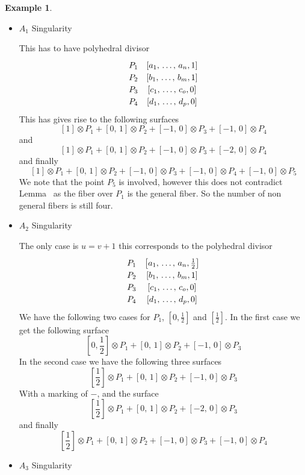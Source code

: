 \documentclass[12pt,a4paper]{book}      %
\theoremstyle{definition}
\newtheorem{ex}[thm]{Example}
\begin{document}
\begin{ex}
\begin{itemize}
\item  \begin{bf} $A_1$ Singularity \end{bf} 

This has to have polyhedral divisor 
\[\def\arraystretch{1.2}
\begin{array}{cc}
P_1 & \left[ a_1, \, \dots , \, a_n, 1 \right] \\ 
P_2 & \left[b_1 , \, \dots, \, b_m, 1 \right] \\
P_3 & \left[c_1, \, \dots, \, c_o, 0\right] \\
P_4 & \left[d_1, \, \dots, \, d_p, 0\right]  \\
\end{array}
\]
This has gives rise to the following surfaces 
\[
\left[1 \right] \otimes P_1 + \left[ 0, \,1 \right] \otimes P_2 + [-1, \, 0] \otimes P_3 + [-1, \, 0] \otimes P_4 
\]
and 
\[
\left[1 \right] \otimes P_1 + \left[ 0, \,1 \right] \otimes P_2 + [-1, \, 0] \otimes P_3 + [-2, \, 0] \otimes P_4 
\]
and finally 
\[
\left[1 \right] \otimes P_1 + \left[ 0, \,1 \right] \otimes P_2 + [-1, \, 0] \otimes P_3 + [-1, \, 0] \otimes P_4  +  [-1, \, 0] \otimes P_5
\]
We note that the point $P_5$ is involved, however this does not contradict Lemma~ as the fiber over $P_1$ is the general fiber. So the number of non general fibers is still four.
\item \begin{bf} $A_2$ Singularity \end{bf} 

The only case is $u = v+1$ this corresponds to the polyhedral divisor
\[\def\arraystretch{1.2}
\begin{array}{cc}
P_1 & \left[ a_1, \, \dots , \, a_n, \frac{1}{2} \right] \\ 
P_2 & \left[b_1 , \, \dots, \, b_m, 1 \right] \\
P_3 & \left[c_1, \, \dots, \, c_o, 0\right] \\
P_4 & \left[d_1, \, \dots, \, d_p, 0\right]  \\
\end{array}
\]
We have the following two cases for $P_1$, $[0, \frac{1}{2}]$ and $[\frac{1}{2}]$. In the first case we get the following surface
\[
\left[0, \frac{1}{2} \right] \otimes P_1 + \left[ 0, \,1 \right] \otimes P_2 + [-1, \, 0] \otimes P_3
\]
In the second case we have the following three surfaces 
\[
\left[ \frac{1}{2} \right] \otimes P_1 + \left[ 0, \,1 \right] \otimes P_2 + [-1, \, 0] \otimes P_3
\]
With a marking of $-$, and the surface
\[
\left[\frac{1}{2} \right] \otimes P_1 + \left[ 0, \,1 \right] \otimes P_2 + [-2, \, 0] \otimes P_3
\]
and finally 
\[
\left[\frac{1}{2} \right] \otimes P_1 + \left[ 0, \,1 \right] \otimes P_2 + [-1, \, 0] \otimes P_3 + [-1, \, 0] \otimes P_4
\]
\item  \begin{bf} $A_3$ Singularity \end{bf} 


\end{itemize}
\end{ex}
\end{document}
